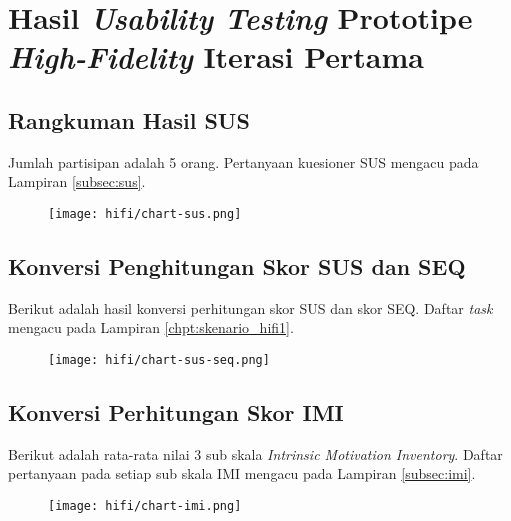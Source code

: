 \chapter{Hasil \textit{Usability Testing} Prototipe \textit{High-Fidelity} Iterasi Pertama}
\label{chpt:hasil_test_hifi1}

\section{Rangkuman Hasil SUS}

Jumlah partisipan adalah 5 orang.
Pertanyaan kuesioner SUS mengacu pada Lampiran \ref{subsec:sus}.

\begin{figure}[h]
  \centering
  \texttt{[image: hifi/chart-sus.png]}
\end{figure}


\section{Konversi Penghitungan Skor SUS dan SEQ}
\normalsize
Berikut adalah hasil konversi perhitungan skor SUS dan skor SEQ. Daftar \textit{task} mengacu pada Lampiran \ref{chpt:skenario_hifi1}.

\begin{figure}[h]
  \centering
  \texttt{[image: hifi/chart-sus-seq.png]}
\end{figure}




\section{Konversi Perhitungan Skor IMI}
\normalsize

Berikut adalah rata-rata nilai 3 sub skala \textit{Intrinsic Motivation Inventory}. Daftar pertanyaan pada setiap sub skala IMI mengacu pada Lampiran \ref{subsec:imi}.

\begin{figure}[h]
  \centering
  \texttt{[image: hifi/chart-imi.png]}
\end{figure}
